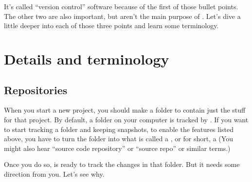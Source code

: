 \documentclass[letterpaper,10pt,english]{jupyterBook}
\begin{document}
\sphinxAtStartPar
It’s called “version control” software because of the first of those bullet points.  The other two are also important, but aren’t the main purpose of .  Let’s dive a little deeper into each of those three points and learn some terminology.


\section{Details and terminology}
\label{\detokenize{chapter-8-version-control:details-and-terminology}}

\subsection{Repositories}
\label{\detokenize{chapter-8-version-control:repositories}}
\sphinxAtStartPar
When you start a new project, you should make a folder to contain just the stuff for that project.  By default, a folder on your computer is  tracked by .  If you want  to start tracking a folder and keeping snapshots, to enable the features listed above, you have to turn the folder into what is called a , or for short, a   (You might also hear “source code repository” or “source repo” or similar terms.)

\sphinxAtStartPar
Once you do so,  is ready to track the changes in that folder.  But it needs some direction from you.  Let’s see why.
\end{document}
